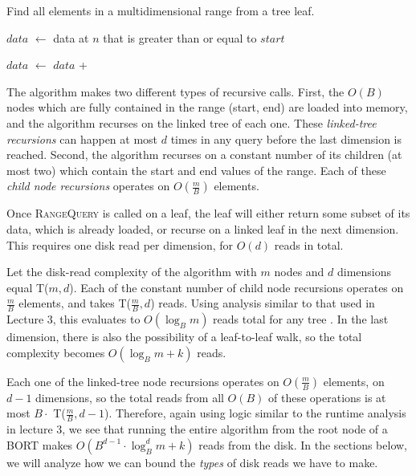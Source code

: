 \documentclass[11pt, oneside]{article}
\newcommand*\Let[2]{\State #1 $\gets$ #2}
\begin{document}
\begin{algorithm}[H]
    \caption{Find all elements in a multidimensional range from a tree leaf.}
    \begin{algorithmic}[1]
            \Let{$data$}{data at $n$ that is greater than or equal to $start$}

            \Let{$data$}{$data$ + } 
            \EndIf

            \State {}
        \EndFunction
    \end{algorithmic}
\end{algorithm}


The algorithm makes two different types of recursive calls. First, the $O(B)$
nodes which are fully contained in the range (start, end) are loaded into
memory, and the algorithm recurses on the linked tree of each one. These
\textit{linked-tree recursions} can happen at most $d$ times in any query before
the last dimension is reached. Second, the algorithm recurses on a constant
number of its children (at most two) which contain the start and end values of
the range. Each of these \textit{child node recursions} operates on
$O(\frac{m}{B})$ elements.

Once \textsc{RangeQuery} is
called on a leaf, the leaf will either return some subset of its data, which is
already loaded, or recurse on a linked leaf in the next dimension. This requires
one disk read per dimension, for $O(d)$ reads in total. 

Let the disk-read complexity of the algorithm with $m$ nodes and $d$ dimensions
equal T($m, d$). Each of the constant number of child node recursions operates
on $\frac{m}{B}$ elements, and takes T($\frac{m}{B}, d$) reads. Using analysis
similar to that used in Lecture 3, this evaluates to $O(\log_B m)$ reads total
for any tree \cite{lecture}. In the last dimension, there is also the
possibility of a leaf-to-leaf walk, so the total complexity becomes $O(\log_B m
+ k)$ reads. 

Each one of the linked-tree node recursions operates on $O(\frac{m}{B})$
elements, on $d-1$ dimensions, so the total reads from all $O(B)$ of these
operations is at most $B \cdot$ T($\frac{m}{B}, d-1$). Therefore, again using
logic similar to the runtime analysis in lecture 3, we see that running the
entire algorithm from the root node of a BORT makes $O(B^{d-1}\cdot\log_B^d m +
k)$ reads from the disk. In the sections below, we will analyze how we can bound
the \textit{types} of disk reads we have to make.
\end{document}
